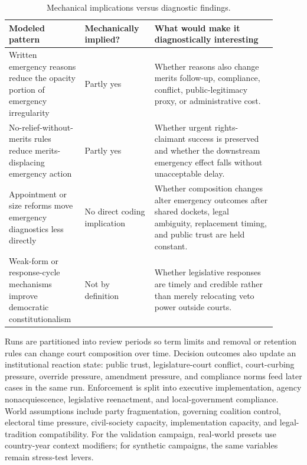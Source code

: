 \documentclass[
  journal=small,
  manuscript=research-article,
  year=2026
]{cup-journal}
\begin{document}
\begin{table}[hbt!]
\centering
\caption{Mechanical implications versus diagnostic findings.}
\label{tab:mechanical-diagnostic}
\scriptsize
\setlength{\tabcolsep}{3pt}
\begin{tabular}{@{}p{0.24\linewidth}p{0.24\linewidth}p{0.42\linewidth}@{}}
\toprule
Modeled pattern & Mechanically implied? & What would make it diagnostically interesting \\
\midrule
Written emergency reasons reduce the opacity portion of emergency irregularity & Partly yes & Whether reasons also change merits follow-up, compliance, conflict, public-legitimacy proxy, or administrative cost. \\
No-relief-without-merits rules reduce merits-displacing emergency action & Partly yes & Whether urgent rights-claimant success is preserved and whether the downstream emergency effect falls without unacceptable delay. \\
Appointment or size reforms move emergency diagnostics less directly & No direct coding implication & Whether composition changes alter emergency outcomes after shared dockets, legal ambiguity, replacement timing, and public trust are held constant. \\
Weak-form or response-cycle mechanisms improve democratic constitutionalism & Not by definition & Whether legislative responses are timely and credible rather than merely relocating veto power outside courts. \\
\bottomrule
\end{tabular}
\end{table}

Runs are partitioned into review periods so term limits and removal or retention rules can change court composition over time. Decision outcomes also update an institutional reaction state: public trust, legislature-court conflict, court-curbing pressure, override pressure, amendment pressure, and compliance norms feed later cases in the same run. Enforcement is split into executive implementation, agency nonacquiescence, legislative reenactment, and local-government compliance. World assumptions include party fragmentation, governing coalition control, electoral time pressure, civil-society capacity, implementation capacity, and legal-tradition compatibility. For the validation campaign, real-world presets use country-year context modifiers; for synthetic campaigns, the same variables remain stress-test levers.
\end{document}

